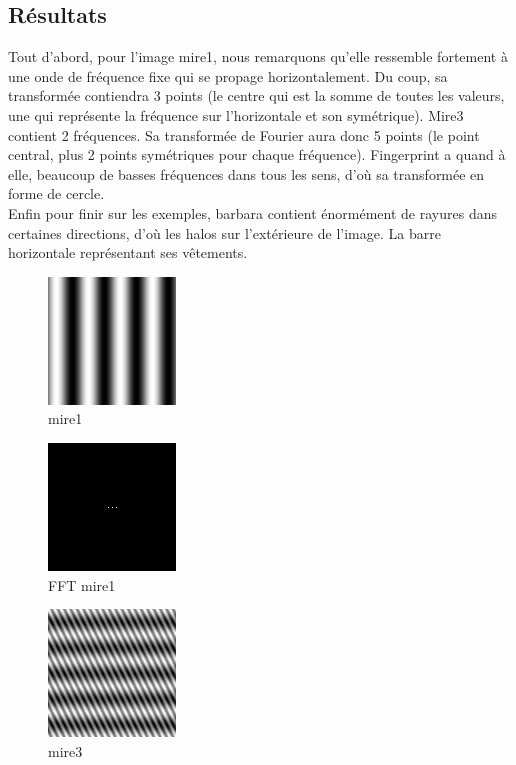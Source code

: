 \documentclass{article}
\begin{document}
\subsection{Résultats}
Tout d'abord, pour l'image mire1, nous remarquons qu'elle ressemble fortement à une onde de fréquence fixe qui se propage horizontalement. Du coup, sa transformée contiendra 3 points (le centre qui est la somme de toutes les valeurs, une qui représente la fréquence sur l'horizontale et son symétrique). Mire3 contient 2 fréquences. Sa transformée de Fourier aura donc 5 points (le point central, plus 2 points symétriques pour chaque fréquence). Fingerprint a quand à elle, beaucoup de basses fréquences dans tous les sens, d'où sa transformée en forme de cercle.\\
Enfin pour finir sur les exemples, barbara contient énormément de rayures dans certaines directions, d'où les halos sur l'extérieure de l'image. La barre horizontale représentant ses vêtements.\\
\begin{figure}
	\begin{center}
		\includegraphics[scale=0.7]{mire1}\\
		mire1
	\end{center}
\end{figure}
\begin{figure}
	\begin{center}
		\includegraphics[scale=0.7]{mire1_FFT}\\
		FFT mire1
	\end{center}
\end{figure}
\begin{figure}
	\begin{center}
		\includegraphics[scale=0.7]{mire3}\\
		mire3
	\end{center}
\end{figure}
\end{document}
